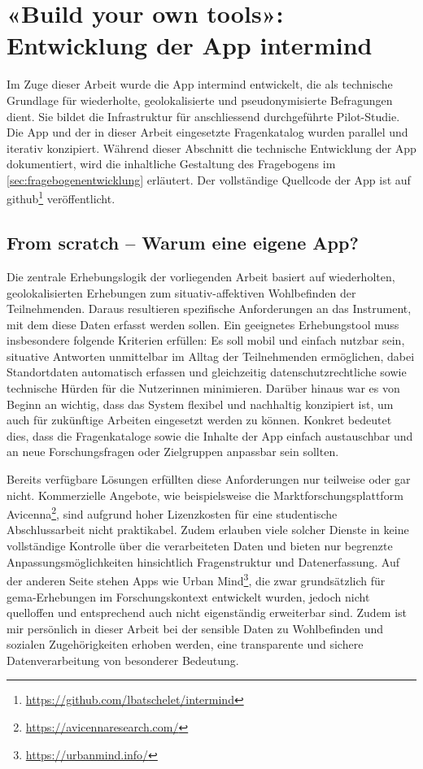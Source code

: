 \section{«Build your own tools»: Entwicklung der App \gls{intermind}}
\label{sec:entwicklung_app}

Im Zuge dieser Arbeit wurde die App \gls{intermind} entwickelt, die als technische Grundlage für wiederholte, geolokalisierte und pseudonymisierte Befragungen dient. Sie bildet die Infrastruktur für anschliessend durchgeführte Pilot-Studie. Die App und der in dieser Arbeit eingesetzte Fragenkatalog wurden parallel und iterativ konzipiert. Während dieser Abschnitt die technische Entwicklung der App dokumentiert, wird die inhaltliche Gestaltung des Fragebogens im \cref{sec:fragebogenentwicklung} erläutert. Der vollständige Quellcode der App ist auf \gls{github}\footnote{\href{https://github.com/lbatschelet/intermind}{https://github.com/lbatschelet/intermind}} veröffentlicht.


\subsection{From scratch -- Warum eine eigene App?}

Die zentrale Erhebungslogik der vorliegenden Arbeit basiert auf wiederholten, geolokalisierten Erhebungen zum situativ-affektiven Wohlbefinden der Teilnehmenden. Daraus resultieren spezifische Anforderungen an das Instrument, mit dem diese Daten erfasst werden sollen. Ein geeignetes Erhebungstool muss insbesondere folgende Kriterien erfüllen: Es soll mobil und einfach nutzbar sein, situative Antworten unmittelbar im Alltag der Teilnehmenden ermöglichen, dabei Standortdaten automatisch erfassen und gleichzeitig datenschutzrechtliche sowie technische Hürden für die Nutzer\genderstern innen minimieren. Darüber hinaus war es von Beginn an wichtig, dass das System flexibel und nachhaltig konzipiert ist, um auch für zukünftige Arbeiten eingesetzt werden zu können. Konkret bedeutet dies, dass die Fragenkataloge sowie die Inhalte der App einfach austauschbar und an neue Forschungsfragen oder Zielgruppen anpassbar sein sollten.

Bereits verfügbare Lösungen erfüllten diese Anforderungen nur teilweise oder gar nicht. Kommerzielle Angebote, wie beispielsweise die Marktforschungsplattform Avicenna\footnote{\href{https://avicennaresearch.com/}{https://avicennaresearch.com/}}, sind aufgrund hoher Lizenzkosten für eine studentische Abschlussarbeit nicht praktikabel. Zudem erlauben viele solcher Dienste in keine vollständige Kontrolle über die verarbeiteten Daten und bieten nur begrenzte Anpassungsmöglichkeiten hinsichtlich Fragenstruktur und Datenerfassung. Auf der anderen Seite stehen Apps wie Urban Mind\footnote{\href{https://urbanmind.info/}{https://urbanmind.info/}}, die zwar grundsätzlich für \gls{gema}-Erhebungen im Forschungskontext entwickelt wurden, jedoch nicht quelloffen und entsprechend auch nicht eigenständig erweiterbar sind. Zudem ist mir persönlich in dieser Arbeit bei der sensible Daten zu Wohlbefinden und sozialen Zugehörigkeiten erhoben werden, eine transparente und sichere Datenverarbeitung von besonderer Bedeutung.

